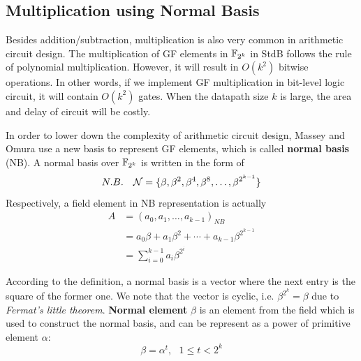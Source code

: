 \subsection{Multiplication using Normal Basis}
Besides addition/subtraction, multiplication is also very common in arithmetic circuit design.
The multiplication of GF elements in ${\mathbb{F}}_{2^k}$ in StdB follows the rule of polynomial multiplication.
However, it will result in $O(k^2)$ bitwise operations. In other words, if we implement GF multiplication
in bit-level logic circuit, it will contain $O(k^2)$ gates. When the datapath size $k$ is large,
the area and delay of circuit will be costly.

In order to lower down the complexity of arithmetic circuit design, Massey and Omura \cite{MasseyOmura} %
use a new basis to represent GF elements, which is called {\bf normal basis} (NB).
A normal basis over ${\mathbb{F}}_{2^k}$ is written in the form of
\begin{equation*}
N.B. ~~~ {\mathcal{N}} = \{\beta,\beta^2,\beta^4,\beta^8,\dots,\beta^{2^{k-1}}\}
\end{equation*}
Respectively, a field element in NB representation is actually
\begin{align*}
A &= (a_0,a_1,\dots,a_{k-1})_{NB} \\
  &= a_0\beta+a_1\beta^2+\cdots+a_{k-1}\beta^{2^{k-1}} \\
  &= \sum_{i=0}^{k-1} a_i\beta^{2^i}
\end{align*}

According to the definition, a normal basis is a vector where the next entry is the square of the former one.
We note that the vector is cyclic, i.e. $\beta^{2^k} = \beta$ due to {\it Fermat's little theorem}.
{\bf Normal element} $\beta$ is an element from the field which is used to construct the normal basis,
and can be represent as a power of primitive element $\alpha$: 
\begin{equation*}
\beta = \alpha^t, ~~~ 1\leq t<2^k
\end{equation*}

